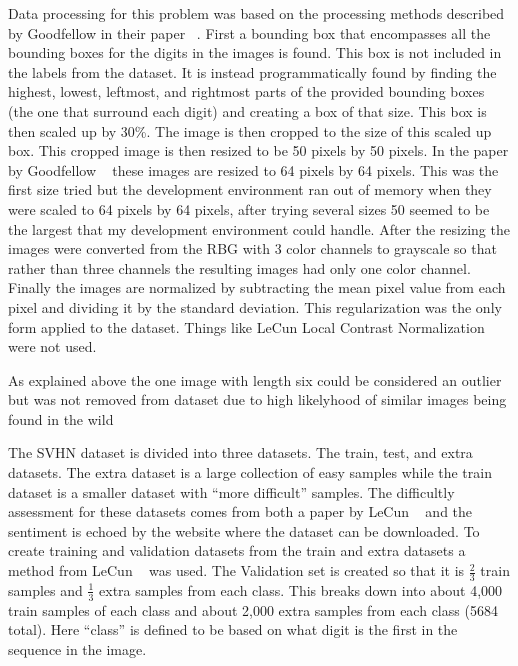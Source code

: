 \documentclass[12pt,twocolumn,letterpaper]{article}
\begin{document}
Data processing for this problem was based on the processing methods described
by Goodfellow \etal in their paper ~\cite{goodfellow}. First a bounding box that encompasses 
all the bounding boxes for the digits in the images is found. This box is not included
in the labels from the dataset. It is instead programmatically found by finding 
the highest, lowest, leftmost, and rightmost parts of the provided bounding boxes 
(the one that surround each digit) and creating a box of that size. This box is then 
scaled up by 30\%. The image is then cropped to the size of this scaled up box.
This cropped image is then resized to be 50 pixels by 50 pixels. In the paper
by Goodfellow \etal ~\cite{goodfellow} these images are resized to 64 pixels by 64 pixels. This
was the first size tried but the development environment ran out of memory
when they were scaled to 64 pixels by 64 pixels, after trying several sizes 50
seemed to be the largest that my development environment could handle. After the 
resizing the images were converted from the RBG with 3 color channels to grayscale 
so that rather than three channels the resulting images had only one color channel. 
Finally the images are normalized by subtracting the mean pixel value from each 
pixel and dividing it by the standard deviation. This regularization was the 
only form applied to the dataset. Things like LeCun Local Contrast Normalization 
were not used.

As explained above the one image with length six could be considered an outlier 
but was not removed from dataset due to high likelyhood of similar images being 
found in the wild 

The SVHN dataset is divided into three datasets. The train, test, and extra datasets.
The extra dataset is a large collection of easy samples while the train dataset is 
a smaller dataset with ``more difficult'' samples. The difficultly assessment for 
these datasets comes from both a paper by LeCun \etal ~\cite{sermanet-icpr-12} and 
the sentiment is echoed by the website where the dataset can be downloaded. To create 
training and validation datasets from the train and extra datasets a method from LeCun \etal ~\cite{sermanet-icpr-12}
was used. The Validation set is created so that it is $\frac{2}{3}$ train samples 
and $\frac{1}{3}$ extra samples from each class. This breaks down into about 4,000 
train samples of each class and about 2,000 extra samples from each class 
(5684 total). Here ``class'' is defined to be based on what digit is the first 
in the sequence in the image.
\end{document}
